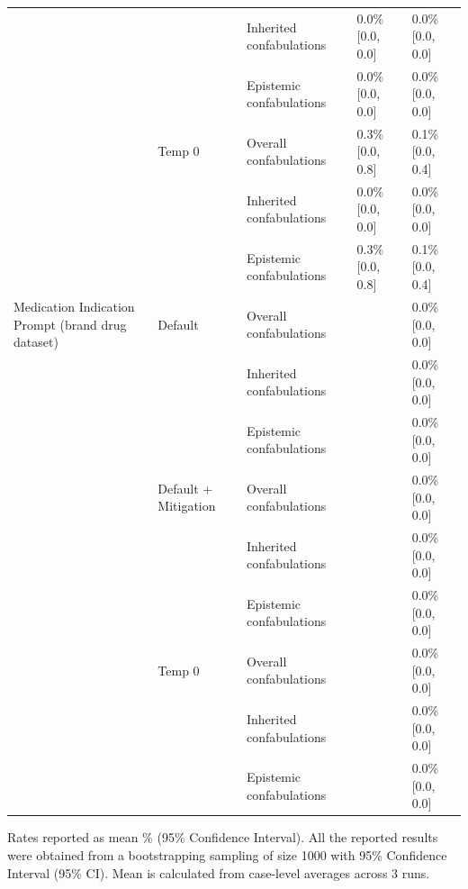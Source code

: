 \begin{tabular}{lllll}
 &  & Inherited confabulations & 0.0\% [0.0, 0.0] & 0.0\% [0.0, 0.0] \\
 &  & Epistemic confabulations & 0.0\% [0.0, 0.0] & 0.0\% [0.0, 0.0] \\
 & Temp 0 & Overall confabulations & 0.3\% [0.0, 0.8] & 0.1\% [0.0, 0.4] \\
 &  & Inherited confabulations & 0.0\% [0.0, 0.0] & 0.0\% [0.0, 0.0] \\
 &  & Epistemic confabulations & 0.3\% [0.0, 0.8] & 0.1\% [0.0, 0.4] \\
Medication Indication Prompt (brand drug dataset) & Default & Overall confabulations &  & 0.0\% [0.0, 0.0] \\
 &  & Inherited confabulations &  & 0.0\% [0.0, 0.0] \\
 &  & Epistemic confabulations &  & 0.0\% [0.0, 0.0] \\
 & Default + Mitigation & Overall confabulations &  & 0.0\% [0.0, 0.0] \\
 &  & Inherited confabulations &  & 0.0\% [0.0, 0.0] \\
 &  & Epistemic confabulations &  & 0.0\% [0.0, 0.0] \\
 & Temp 0 & Overall confabulations &  & 0.0\% [0.0, 0.0] \\
 &  & Inherited confabulations &  & 0.0\% [0.0, 0.0] \\
 &  & Epistemic confabulations &  & 0.0\% [0.0, 0.0] \\
\bottomrule
\end{tabular}

\medskip
\noindent


Rates reported as mean \% (95\% Confidence Interval). All the reported results were obtained from a bootstrapping sampling of size 1000 with 95\% Confidence Interval (95\% CI). Mean is calculated from case-level averages across 3 runs.
